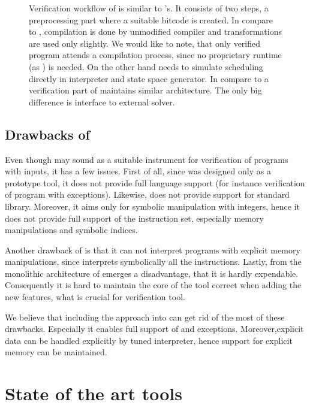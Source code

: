 \begin{figure}[!ht]
{
}
\caption{ Verification workflow of \SymDIVINE is similar to \DIVINE{}'s. It consists
of two steps, a preprocessing part where a suitable \LLVM bitcode is created. In compare to
\DIVINE, compilation is done by unmodified compiler and \LART transformations
are used only slightly. We would like to note, that only verified program
attends a compilation process, since no \SymDIVINE proprietary runtime (as \DIOS) is
needed. On the other hand \SymDIVINE needs to simulate scheduling directly in
interpreter and state space generator. In compare to \DIVINE a verification part
of \SymDIVINE maintains similar architecture. The only big difference is
interface to external \SMT solver.}\label{fig:symdivine}
\end{figure}


\subsection{Drawbacks of \SymDIVINE}
Even though \SymDIVINE may sound as a suitable instrument for verification of
programs with inputs, it has a few issues. First of all, since
\SymDIVINE was designed only as a prototype tool, it does not provide full \Cpp{}
language support (for instance verification of program with exceptions).
Likewise, \SymDIVINE does not provide support for \Cpp{} standard library.
Moreover, it aims only for symbolic manipulation with integers, hence it
does not provide full support of the \LLVM instruction set, especially memory
manipulations and symbolic indices.

Another drawback of \SymDIVINE is that it can not interpret programs with
explicit memory manipulations, since \SymDIVINE interprets symbolically all the
instructions. Lastly, from the monolithic architecture of \SymDIVINE emerges a
disadvantage, that it is hardly expendable. Consequently it is hard to maintain
the core of the tool correct when adding the new features, what is
crucial for verification tool.

We believe that including the \SymDIVINE approach into \DIVINE can get rid
of the most of these drawbacks. Especially it enables full support of \LLVM and
\Cpp{} exceptions. Moreover,explicit data can be handled explicitly by
tuned \DIVINE interpreter, hence support for explicit memory can be
maintained.

\section{State of the art tools}


